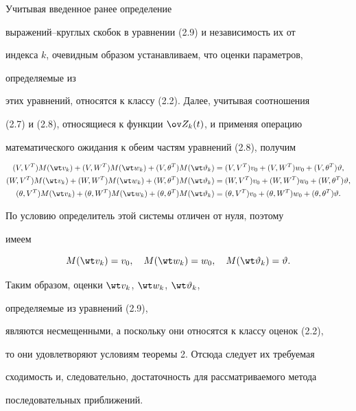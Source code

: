 \begin{pf} Учитывая введенное ранее определение 


выражений--круглых скобок в уравнении (2.9) и независимость их от 


индекса $k$, очевидным образом устанавливаем, что оценки параметров, 


определяемые из 


этих уравнений, относятся к классу (2.2). Далее, учитывая соотношения 


(2.7) и (2.8), относящиеся к функции $\ov Z_k(t)$, и применяя операцию 


математического ожидания к обеим частям уравнений (2.8), получим 


\begin{align*} 


(V,V^T)M(\wt v_k)+(V,W^T)M(\wt w_k)+ 


(V,\theta^T)M(\wt\vartheta_k)&=(V,V^T)v_0+ 


(V,W^T)w_0+(V,\theta^T)\vartheta,\\ 


% 


(W,V^T)M(\wt v_k)+(W,W^T)M(\wt w_k)+ 


(W,\theta^T)M(\wt\vartheta_k)&=(W,V^T)v_0+ 


(W,W^T)w_0+(W,\theta^T)\vartheta,\\ 


% 


(\theta,V^T)M(\wt v_k)+(\theta,W^T)M(\wt w_k)+ 


(\theta,\theta^T)M(\wt\vartheta_k)&=(\theta,V^T)v_0+ 


(\theta,W^T)w_0+(\theta,\theta^T)\vartheta. 


\end{align*} 


По условию определитель этой системы отличен от нуля, поэтому 


имеем 


$$ 


M(\wt v_k)=v_0,\quad M(\wt w_k)=w_0,\quad 


M(\wt\vartheta_k)=\vartheta. 


$$ 


 


Таким образом, оценки $\wt v_k$, $\wt w_k$, $\wt\vartheta_k$, 


определяемые из уравнений (2.9), 


являются несмещенными, а поскольку они относятся к классу оценок (2.2), 


то они удовлетворяют условиям теоремы 2. Отсюда следует их требуемая 


сходимость и, следовательно, достаточность для рассматриваемого метода 


последовательных приближений. 


\end{pf} 


